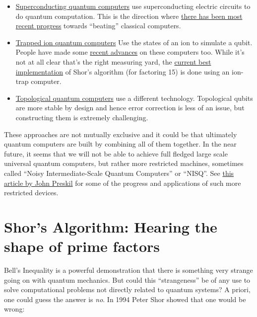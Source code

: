 \begin{itemize}
\item
  \href{https://en.wikipedia.org/wiki/Superconducting_quantum_computing}{Superconducting
  quantum computers} use superconducting electric circuits to do quantum
  computation. This is the direction where
  \href{https://arxiv.org/abs/1709.06678}{there has been most recent
  progress} towards ``beating'' classical computers.
\item
  \href{https://en.wikipedia.org/wiki/Trapped_ion_quantum_computer}{Trapped
  ion quantum computers} Use the states of an ion to simulate a qubit.
  People have made some
  \href{http://iontrap.umd.edu/wp-content/uploads/2016/02/1602.02840v1.pdf}{recent
  advances} on these computers too. While it's not at all clear that's
  the right measuring yard, the
  \href{http://arxiv.org/abs/1507.08852}{current best implementation} of
  Shor's algorithm (for factoring 15) is done using an ion-trap
  computer.
\item
  \href{https://en.wikipedia.org/wiki/Topological_quantum_computer}{Topological
  quantum computers} use a different technology. Topological qubits are
  more stable by design and hence error correction is less of an issue,
  but constructing them is extremely challenging.
\end{itemize}

These approaches are not mutually exclusive and it could be that
ultimately quantum computers are built by combining all of them
together. In the near future, it seems that we will not be able to
achieve full fledged large scale universal quantum computers, but rather
more restricted machines, sometimes called ``Noisy Intermediate-Scale
Quantum Computers'' or ``NISQ''. See
\href{https://arxiv.org/abs/1801.00862}{this article by John Preskil}
for some of the progress and applications of such more restricted
devices.

\section{Shor's Algorithm: Hearing the shape of prime
factors}\label{Shors-Algorithm-Hearing-t}

Bell's Inequality is a powerful demonstration that there is something
very strange going on with quantum mechanics. But could this
``strangeness'' be of any use to solve computational problems not
directly related to quantum systems? A priori, one could guess the
answer is \emph{no}. In 1994 Peter Shor showed that one would be wrong:

